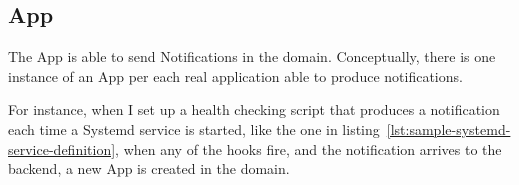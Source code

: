 \subsection{App}\label{sec:app}

The App is able to send Notifications
in the domain.
Conceptually,
there is one instance of an App
per each real application
able to produce notifications.

For instance,
when I set up a health checking script
that produces a notification each time
a Systemd service is started,
like the one in listing~\ref{lst:sample-systemd-service-definition},
when any of the hooks fire,
and the notification arrives to the backend,
a new App is created in the domain.
